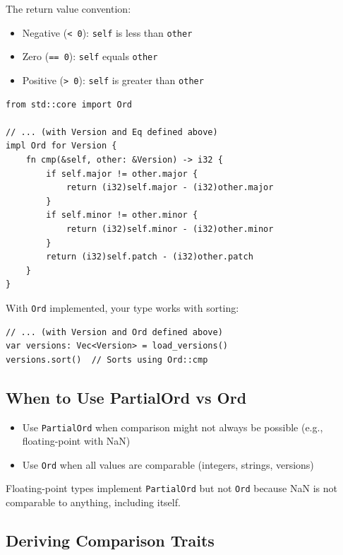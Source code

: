 The return value convention:
\begin{itemize}
    \item Negative (\texttt{< 0}): \texttt{self} is less than \texttt{other}
    \item Zero (\texttt{== 0}): \texttt{self} equals \texttt{other}
    \item Positive (\texttt{> 0}): \texttt{self} is greater than \texttt{other}
\end{itemize}

\begin{lstlisting}
from std::core import Ord

// ... (with Version and Eq defined above)
impl Ord for Version {
    fn cmp(&self, other: &Version) -> i32 {
        if self.major != other.major {
            return (i32)self.major - (i32)other.major
        }
        if self.minor != other.minor {
            return (i32)self.minor - (i32)other.minor
        }
        return (i32)self.patch - (i32)other.patch
    }
}
\end{lstlisting}

With \texttt{Ord} implemented, your type works with sorting:

\begin{lstlisting}
// ... (with Version and Ord defined above)
var versions: Vec<Version> = load_versions()
versions.sort()  // Sorts using Ord::cmp
\end{lstlisting}

\subsection{When to Use PartialOrd vs Ord}

\begin{itemize}
    \item Use \texttt{PartialOrd} when comparison might not always be possible (e.g., floating-point with NaN)
    \item Use \texttt{Ord} when all values are comparable (integers, strings, versions)
\end{itemize}

Floating-point types implement \texttt{PartialOrd} but not \texttt{Ord} because NaN is not comparable to anything, including itself.

\subsection{Deriving Comparison Traits}

